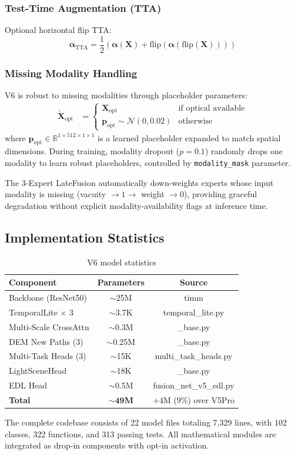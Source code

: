 \subsubsection{Test-Time Augmentation (TTA)}

Optional horizontal flip TTA:
\begin{equation}
    \boldsymbol{\alpha}_{\text{TTA}} = \frac{1}{2}\left(
    \boldsymbol{\alpha}(\mathbf{X}) + \text{flip}(\boldsymbol{\alpha}(
    \text{flip}(\mathbf{X})))\right)
\end{equation}

\subsubsection{Missing Modality Handling}

V6 is robust to missing modalities through placeholder parameters:
\begin{align}
    \tilde{\mathbf{X}}_{\text{opt}} &=
    \begin{cases}
        \mathbf{X}_{\text{opt}} & \text{if optical available} \\
        \mathbf{p}_{\text{opt}} \sim \mathcal{N}(0, 0.02) & \text{otherwise}
    \end{cases}
\end{align}
where $\mathbf{p}_{\text{opt}} \in \mathbb{R}^{1 \times 512 \times 1 \times 1}$
is a learned placeholder expanded to match spatial dimensions. During training,
modality dropout ($p=0.1$) randomly drops one modality to learn robust
placeholders, controlled by \texttt{modality\_mask} parameter.

The 3-Expert LateFusion automatically down-weights experts whose input modality
is missing (vacuity $\to 1 \to$ weight $\to 0$), providing graceful degradation
without explicit modality-availability flags at inference time.

\subsection{Implementation Statistics}

\begin{table}[h]
\centering
\caption{V6 model statistics}
\begin{tabular}{lcc}
\toprule
\textbf{Component} & \textbf{Parameters} & \textbf{Source} \\
\midrule
Backbone (ResNet50) & $\sim$25M & timm \\
TemporalLite $\times$ 3 & $\sim$3.7K & temporal\_lite.py \\
Multi-Scale CrossAttn & $\sim$0.3M & \_base.py \\
DEM New Paths (3) & $\sim$0.25M & \_base.py \\
Multi-Task Heads (3) & $\sim$15K & multi\_task\_heads.py \\
LightSceneHead & $\sim$18K & \_base.py \\
EDL Head & $\sim$0.5M & fusion\_net\_v5\_edl.py \\
\textbf{Total} & $\mathbf{\sim49M}$ & $+4\text{M}$ (9\%) over V5Pro \\
\bottomrule
\end{tabular}
\end{table}

The complete codebase consists of 22 model files totaling 7,329 lines, with
102 classes, 322 functions, and 313 passing tests. All mathematical modules
are integrated as drop-in components with opt-in activation.
